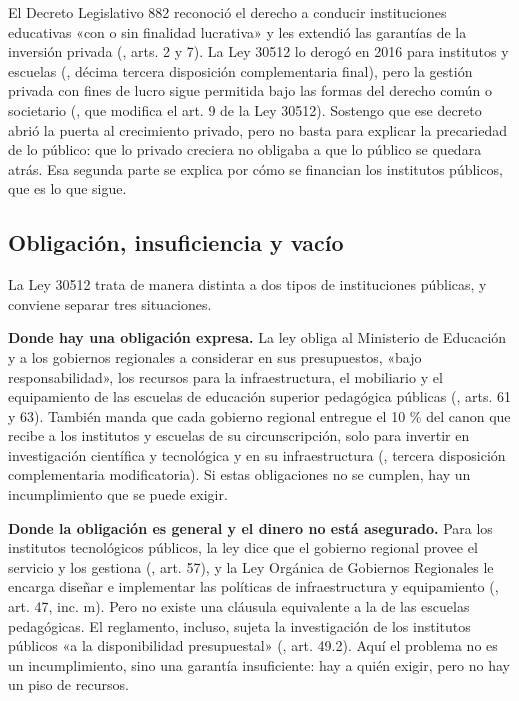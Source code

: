 \documentclass[
  jou,
  floatsintext,
  longtable,
  a4paper,
  nolmodern,
  notxfonts,
  notimes,
  12pt,
  colorlinks=true,linkcolor=blue,citecolor=blue,urlcolor=blue]{apa7}
\begin{document}
El Decreto Legislativo 882 reconoció el derecho a conducir instituciones
educativas «con o sin finalidad lucrativa» y les extendió las garantías
de la inversión privada
(, arts. 2 y 7). La Ley 30512 lo derogó en 2016 para institutos
y escuelas (, décima tercera disposición complementaria final), pero la
gestión privada con fines de lucro sigue permitida bajo las formas del
derecho común o societario
(, que modifica el art. 9 de la Ley 30512). Sostengo que
ese decreto abrió la puerta al crecimiento privado, pero no basta para
explicar la precariedad de lo público: que lo privado creciera no
obligaba a que lo público se quedara atrás. Esa segunda parte se explica
por cómo se financian los institutos públicos, que es lo que sigue.

\subsection{Obligación, insuficiencia y
vacío}\label{obligaciuxf3n-insuficiencia-y-vacuxedo}

La Ley 30512 trata de manera distinta a dos tipos de instituciones
públicas, y conviene separar tres situaciones.

\textbf{Donde hay una obligación expresa.} La ley obliga al Ministerio
de Educación y a los gobiernos regionales a considerar en sus
presupuestos, «bajo responsabilidad», los recursos para la
infraestructura, el mobiliario y el equipamiento de las escuelas de
educación superior pedagógica públicas
(, arts. 61 y 63). También manda que cada gobierno regional entregue
el 10 \% del canon que recibe a los institutos y escuelas de su
circunscripción, solo para invertir en investigación científica y
tecnológica y en su infraestructura
(, tercera disposición complementaria modificatoria). Si estas
obligaciones no se cumplen, hay un incumplimiento que se puede exigir.

\textbf{Donde la obligación es general y el dinero no está asegurado.}
Para los institutos tecnológicos públicos, la ley dice que el gobierno
regional provee el servicio y los gestiona
(, art. 57), y la Ley Orgánica de Gobiernos Regionales le encarga
diseñar e implementar las políticas de infraestructura y equipamiento
(, art.
47, inc. m). Pero no existe una cláusula equivalente a la de las
escuelas pedagógicas. El reglamento, incluso, sujeta la investigación de
los institutos públicos «a la disponibilidad presupuestal»
(, art. 49.2). Aquí el problema no es un
incumplimiento, sino una garantía insuficiente: hay a quién exigir, pero
no hay un piso de recursos.
\end{document}
